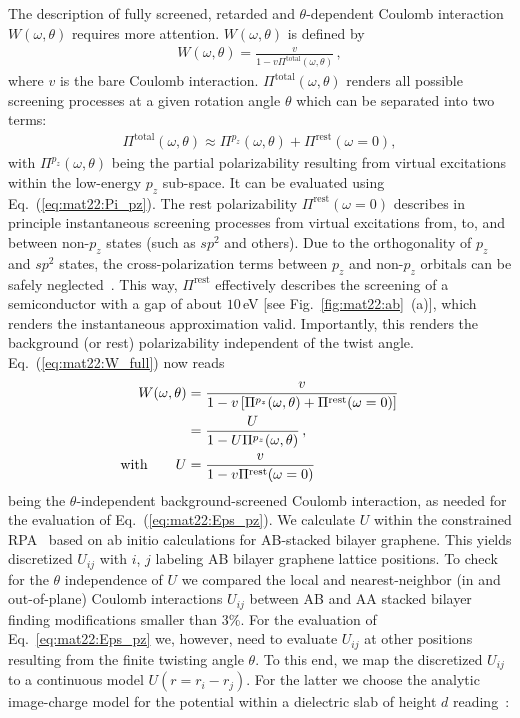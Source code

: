 The description of fully screened, retarded and $\theta$-dependent Coulomb interaction $W(\omega, \theta)$ requires more attention. $W(\omega, \theta)$ is defined by 
\begin{align}\label{eq:mat22:W_full}
    W(\omega, \theta) = \frac{v}{1 - v \Pi^\text{total}(\omega, \theta)} \,,
\end{align}
where $v$ is the bare Coulomb interaction. $\Pi^\text{total}(\omega, \theta)$ renders all possible screening processes at a given rotation angle $\theta$ which can be separated into two terms:
\begin{align*}
     \Pi^\text{total}(\omega, \theta) \approx 
         \Pi^{p_z}(\omega, \theta) + \Pi^\text{rest}(\omega = 0),
\end{align*}
with $\Pi^{p_z}(\omega, \theta)$ being the partial polarizability resulting from virtual excitations within the low-energy $p_z$ sub-space. It can be evaluated using Eq.~(\ref{eq:mat22:Pi_pz}). The rest polarizability $\Pi^\text{rest}(\omega = 0)$ describes in principle instantaneous screening processes from virtual excitations from, to, and between non-$p_z$ states (such as $sp^2$ and others). Due to the orthogonality of $p_z$ and $sp^2$ states, the cross-polarization terms between $p_z$ and non-$p_z$ orbitals can be safely neglected~\cite{van_loon_random_2021}. This way, $\Pi^\text{rest}$ effectively describes the screening of a semiconductor with a gap of about $10\,$eV [see Fig.~\ref{fig:mat22:ab}~(a)], which renders the  instantaneous approximation valid. Importantly, this renders the background (or rest) polarizability independent of the twist angle. Eq.~(\ref{eq:mat22:W_full}) now reads
\begin{align*}
    W(\omega, \theta) 
    &= \frac{v}{1 - v \left[\Pi^{p_z}(\omega, \theta) + \Pi^\text{rest}(\omega = 0)\right]}\\
    &= \frac{U}{1 - U \Pi^{p_z}(\omega, \theta)}\,, \notag \\
    \text{with} \qquad U &= \frac{v}{1 - v \Pi^\text{rest}(\omega = 0)}
\end{align*}
being the $\theta$-independent background-screened Coulomb interaction, as needed for the evaluation of Eq.~(\ref{eq:mat22:Eps_pz}). We calculate $U$ within the constrained RPA~\cite{cRPA} based on ab initio calculations for AB-stacked bilayer graphene.%
This yields discretized $U_{ij}$ with $i$, $j$ labeling AB bilayer graphene lattice positions. To check for the $\theta$ independence of $U$ we compared the local and nearest-neighbor (in and out-of-plane) Coulomb interactions $U_{ij}$ between AB and AA stacked bilayer finding modifications smaller than $3\%$. For the evaluation of Eq.~\eqref{eq:mat22:Eps_pz} we, however, need to evaluate $U_{ij}$ at other positions resulting from the finite twisting angle $\theta$. To this end, we map the discretized $U_{ij}$ to a continuous model $U(r = r_i - r_j)$. For the latter we choose the analytic image-charge model for the potential within a dielectric slab of height $d$ reading~\cite{keldysh_coulomb_1979,jena_enhancement_2007,emelyanenko_effect_2008,jiang_plasmonic_2021}:
